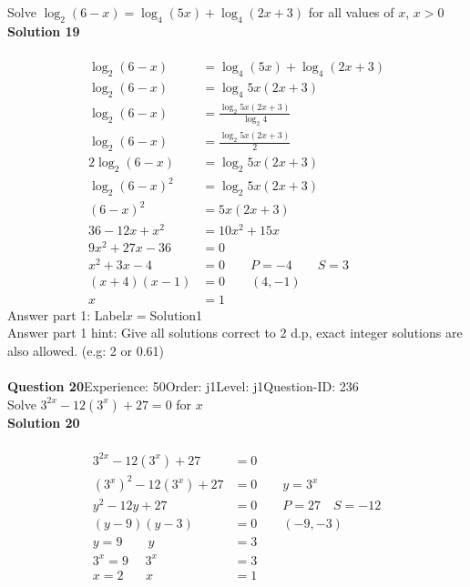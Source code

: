 \documentclass{article}
\begin{document}
Solve $\log_{2}(6-x)=\log_{4}(5x)+\log_{4}(2x+3)$ for all values of $x$, $x>0$\\[4pt]
\noindent\textbf{Solution 19}\\[2pt]
\\[-35pt]\begin{align*}
\log_{2}(6-x)&=\log_{4}(5x)+\log_{4}(2x+3)\\[2pt]
\log_{2}(6-x)&=\log_{4}5x(2x+3)\\[2pt]
\log_{2}(6-x)&=\displaystyle\frac{\log_{2}5x(2x+3)}{\log_{2}4}\\[2pt]
\log_{2}(6-x)&=\displaystyle\frac{\log_{2}5x(2x+3)}{2}\\[2pt]
2\log_{2}(6-x)&=\log_{2}5x(2x+3)\\[2pt]
\log_{2}(6-x)^2&=\log_{2}5x(2x+3)\\[2pt]
(6-x)^2&=5x(2x+3)\\[2pt]
36-12x+x^2&=10x^2+15x\\[2pt]
9x^2+27x-36&=0\\[2pt]
x^2+3x-4&=0\qquad P=-4 \qquad S=3\\[2pt]
(x+4)(x-1)&=0 \qquad (4,-1)\\[2pt]
x&=1
\end{align*}
Answer part 1: \hspace{10pt}Label\hspace{10pt}$x=$\hspace{10pt}Solution\hspace{10pt}1\\
Answer part 1 hint: \hspace{15pt}Give all solutions correct to 2 d.p, exact integer solutions are also allowed. (e.g: 2 or 0.61)\\
\\[4pt]
\noindent\textbf{Question 20}\hspace{20pt}Experience: 50\hspace{20pt}Order: j1\hspace{20pt}Level: j1\hspace{20pt}Question-ID: 236\\[2pt]
Solve $3^{2x}-12(3^x)+27=0$ for $x$\\[4pt]
\noindent\textbf{Solution 20}\\[2pt]
\\[-35pt]\begin{align*}
3^{2x}-12(3^x)+27&=0\\[2pt]
(3^x)^2-12(3^x)+27&=0\qquad y=3^x\\[2pt]
y^2-12y+27&=0\qquad P=27 \quad S=-12\\[2pt]
(y-9)(y-3)&=0\qquad (-9,-3)\\[2pt]
y=9 \qquad y&=3\\[2pt]
3^x=9\hspace{16pt} 3^x&=3\\[2pt]
x=2 \hspace{21pt} x&=1
\end{align*}
\end{document}
